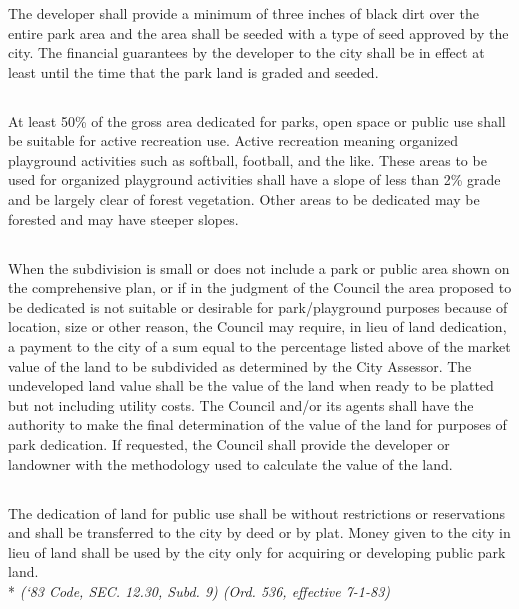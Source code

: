 \subsubsection{}
The developer shall provide a minimum of three inches of black dirt over the entire park area and the area shall be seeded with a type of seed approved by the city. The financial guarantees by the developer to the city shall be in effect at least until the time that the park land is graded and seeded.
\subsection{}
At least 50\% of the gross area dedicated for parks, open space or public use shall be suitable for active recreation use. Active recreation meaning organized playground activities such as softball, football, and the like. These areas to be used for organized playground activities shall have a slope of less than 2\% grade and be largely clear of forest vegetation. Other areas to be dedicated may be forested and may have steeper slopes.
\subsection{}
When the subdivision is small or does not include a park or public area shown on the comprehensive plan, or if in the judgment of the Council the area proposed to be dedicated is not suitable or desirable for park/playground purposes because of location, size or other reason, the Council may require, in lieu of land dedication, a payment to the city of a sum equal to the percentage listed above of the market value of the land to be subdivided as determined by the City Assessor. The undeveloped land value shall be the value of the land when ready to be platted but not including utility costs. The Council and/or its agents shall have the authority to make the final determination of the value of the land for purposes of park dedication. If requested, the Council shall provide the developer or landowner with the methodology used to calculate the value of the land.
\subsection{}
The dedication of land for public use shall be without restrictions or reservations and shall be transferred to the city by deed or by plat. Money given to the city in lieu of land shall be used by the city only for acquiring or developing public park land.\\*
\emph{(‘83 Code, SEC. 12.30, Subd. 9)  (Ord. 536, effective 7-1-83)}\\



